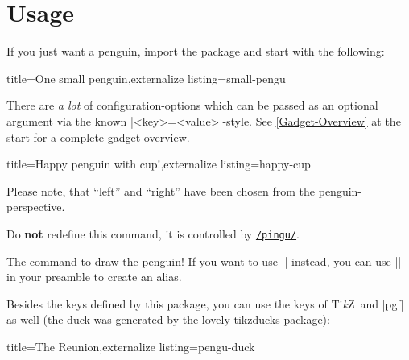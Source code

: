 \documentclass[parskip=half,english,numbers=noenddot,footnotes=nomultiple,oneside,fontsize=10pt,DIV=15,headinclude]{scrartcl}
\makeatletter
\let\say\enquote
\def\pingu@listing@text{}
\def\lpingu#1{\begingroup\def\pingu@listing@text{#1}\lstinline[style=lstpingu,breakatwhitespace]'#1'\endgroup}
\let\@explainsuff\@empty
\let\@labelhack\@empty
\newcommand*\keyref[2][/pingu/]{\hyperref[pk:#1#2]{\lpingu{#1#2}}}
\newenvironment{commandexplain}[3][]{%
\begingroup
\def\@labelhack{/pingu/}%
\def\mand##1{\texttt{\{\textsf{\small##1}\}}}%
\def\@pingu@command@keypartner{#1}%
\newcommand\opt[2][]{\texttt{\textit{[\textsf{\small##2\ifx!##1!\else\textcolor{gray}{\small\sffamily=##1}\fi}]}}}%
\def\@explainsuff{#3}%
\keyexplain[]{\\#2}{}{}%
\ifx\@pingu@command@keypartner\@empty\else
{\@declaredcolor{gray}\footnotesize Do \textbf{not} redefine this command, it is controlled by \keyref{#1}.}\par\fi
}{\endkeyexplain\endgroup}
\def\TikZ{Ti\textit{k}Z}
\makeatother
\begin{document}
\section{Usage}\label{Usage}

If you just want a penguin, import the package and start with the following:
\begin{tcblisting}{title={One small penguin},externalize listing=small-pengu}
\begin{tikzpicture}
	\pingu
\end{tikzpicture}
\end{tcblisting}

There are \textit{a lot} of configuration-options which can be passed as an optional argument via the known |<key>=<value>|-style. See \autoref{Gadget-Overview} at the start for a complete gadget overview.
\begin{tcblisting}{title={Happy penguin with cup!},externalize listing=happy-cup}
\end{tcblisting}
Please note, that \say{left} and \say{right} have been chosen from the penguin-perspective.

\begin{commandexplain}{pingu}{\opt{penguin keys}}
	The command to draw the penguin!
	If you want to use |\pengu| instead, you can use |\let\pengu\pingu| in your preamble to create an alias.
\end{commandexplain}

\clearpage Besides the keys defined by this package, you can use the keys of \TikZ\ and |pgf| as well (the duck was generated by the lovely \href{https://github.com/samcarter/tikzducks}{tikzducks} package):
\begin{tcblisting}{title={The Reunion},externalize listing=pengu-duck}
\begin{tikzpicture}
	\duck
	\pingu[xshift=2.7cm, yshift=14mm,
	       eyes wink]
\end{tikzpicture}
\end{tcblisting}
\end{document}
